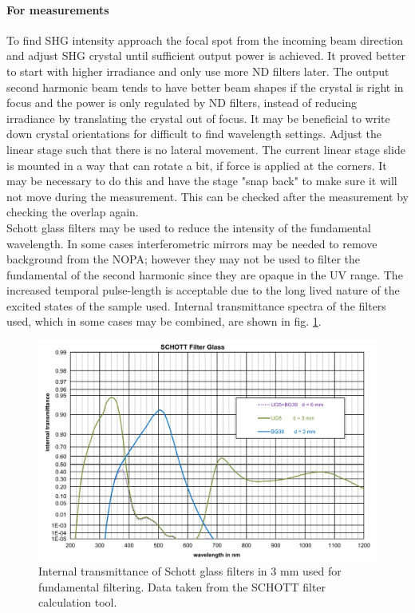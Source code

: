 \documentclass[twoside,openright,listof=numbered]{scrreprt}
\begin{document}
\paragraph{For measurements}
To find SHG intensity approach the focal spot from the incoming beam direction and adjust SHG crystal until sufficient output power is achieved. It proved better to start with higher irradiance and only use more ND filters later. The output second harmonic beam tends to have better beam shapes if the crystal is right in focus and the power is only regulated by ND filters, instead of reducing irradiance by translating the crystal out of focus. It may be beneficial to write down crystal orientations for difficult to find wavelength settings.\newline
Adjust the linear stage such that there is no lateral movement. The current linear stage slide is mounted in a way that can rotate a bit, if force is applied at the corners. It may be necessary to do this and have the stage "snap back" to make sure it will not move during the measurement. This can be checked after the measurement by checking the overlap again.\\
Schott glass filters may be used to reduce the intensity of the fundamental wavelength. In some cases interferometric mirrors may be needed to remove background from the NOPA; however they may not be used to filter the fundamental of the second harmonic since they are opaque in the UV range. The increased temporal pulse-length is acceptable due to the long lived nature of the excited states of the sample used. Internal transmittance spectra of the filters used, which in some cases may be combined, are shown in fig. \ref{fig:SchottFilters}.

\begin{figure}[hbtp]
\centering
\includegraphics[scale = 1]{images/SchottFiltersFromTool.png}
\caption[Internal transmittance of Schott glass filters in 3 mm used for fundamental filtering.]{Internal transmittance of Schott glass filters in 3 mm used for fundamental filtering.\label{fig:SchottFilters} Data taken from the SCHOTT filter calculation tool.}
\end{figure}
\end{document}
